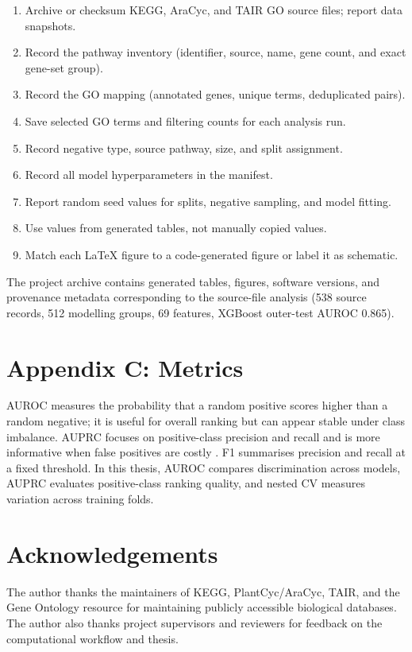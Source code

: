 \documentclass[12pt,twoside]{article}
\begin{document}
\begin{enumerate}[leftmargin=*]
  \item Archive or checksum KEGG, AraCyc, and TAIR GO source files; report data snapshots.
  \item Record the pathway inventory (identifier, source, name, gene count, and exact gene-set group).
  \item Record the GO mapping (annotated genes, unique terms, deduplicated pairs).
  \item Save selected GO terms and filtering counts for each analysis run.
  \item Record negative type, source pathway, size, and split assignment.
  \item Record all model hyperparameters in the manifest.
  \item Report random seed values for splits, negative sampling, and model fitting.
  \item Use values from generated tables, not manually copied values.
  \item Match each LaTeX figure to a code-generated figure or label it as schematic.
\end{enumerate}

The project archive contains generated tables, figures, software versions, and provenance metadata corresponding to the source-file analysis (538 source records, 512 modelling groups, 69 features, XGBoost outer-test AUROC 0.865).

\section{Appendix C: Metrics}
\label{app:metrics}

AUROC measures the probability that a random positive scores higher than a random negative; it is useful for overall ranking but can appear stable under class imbalance. AUPRC focuses on positive-class precision and recall and is more informative when false positives are costly \citep{saito2015precision}. F1 summarises precision and recall at a fixed threshold. In this thesis, AUROC compares discrimination across models, AUPRC evaluates positive-class ranking quality, and nested CV measures variation across training folds.


\section*{Acknowledgements}
The author thanks the maintainers of KEGG, PlantCyc/AraCyc, TAIR, and the Gene Ontology resource for maintaining publicly accessible biological databases. The author also thanks project supervisors and reviewers for feedback on the computational workflow and thesis.
\end{document}

